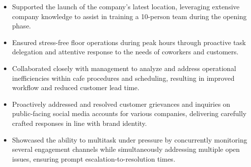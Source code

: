 \documentclass[10pt,a4paper,ragged2e,withhyper]{altacv}
\begin{document}
        \vspace{-2.5em}
            \vspace{-0.5em}
            \begin{itemize}
            \item Supported the launch of the company's latest location, leveraging extensive company knowledge to assist in training a 10-person team during the opening phase.
            \item Ensured stress-free floor operations during peak hours through proactive task delegation and attentive response to the needs of coworkers and customers.
            \item Collaborated closely with management to analyze and address operational inefficiencies within cafe procedures and scheduling, resulting in improved workflow and reduced customer lead time.
            \end{itemize}
            \vspace{-0.5em}
            \divider
            \vspace{0.5em}
            \vspace{-0.5em}
            \begin{itemize}
            \item Proactively addressed and resolved customer grievances and inquiries on public-facing social media accounts for various companies, delivering carefully crafted responses in line with brand identity.
            \item Showcased the ability to multitask under pressure by concurrently monitoring several engagement channels while simultaneously addressing multiple open issues, ensuring prompt escalation-to-resolution times.
            \end{itemize}
\end{document}
